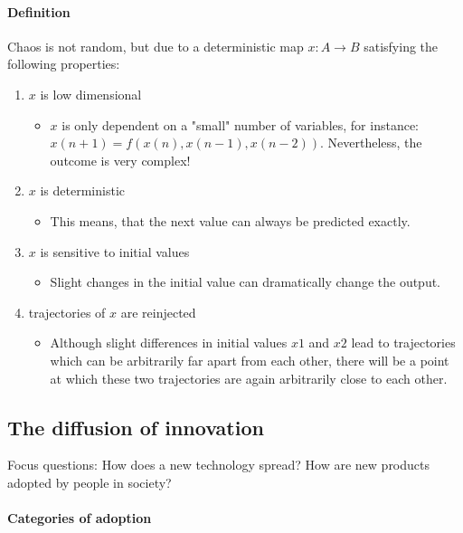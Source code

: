\paragraph{Definition}
Chaos is not random, but due to a deterministic map $x: A \rightarrow B$
satisfying the following properties:
\begin{enumerate}
    \item $x$ is low dimensional
        \begin{itemize}
            \item $x$ is only dependent on a "small" number of variables,
                for instance: $x(n+1) = f(x(n),x(n-1),x(n-2))$. Nevertheless,
                the outcome is very complex!
        \end{itemize}
    \item $x$ is deterministic
        \begin{itemize}
            \item This means, that the next value can always be predicted exactly.
        \end{itemize}
    \item $x$ is sensitive to initial values
        \begin{itemize}
            \item Slight changes in the initial value can dramatically change
                the output.
        \end{itemize}
    \item trajectories of $x$ are reinjected
        \begin{itemize}
            \item Although slight differences in initial values $x1$ and $x2$
                lead to trajectories which can be arbitrarily far apart from
                each other, there will be a point at which these two trajectories
                are again arbitrarily close to each other.
        \end{itemize}
\end{enumerate}

\pagebreak

\subsection{The diffusion of innovation}

Focus questions: How does a new technology spread? How are new products
adopted by people in society?

\paragraph{Categories of adoption}

